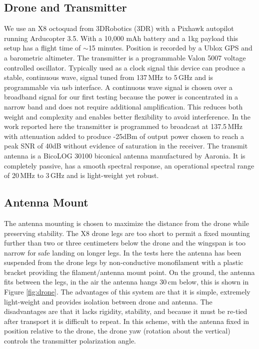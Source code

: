 \documentclass[preprint2,numberedappendix,tighten,twocolappendix]{aastex6}
\begin{document}
\subsection{Drone and Transmitter}
We use an X8 octoquad from 3DRobotics (3DR) with a Pixhawk autopilot running Arducopter 3.5.  With a 10,000 mAh battery and a 1kg payload this setup has a flight time of $\sim$15 minutes. Position is recorded by a Ublox GPS and a barometric altimeter.  The transmitter is a programmable Valon 5007 voltage controlled oscillator. Typically used as a clock signal this device can produce a stable, continuous wave, signal tuned from 137\,MHz to 5\,GHz and is programmable via usb interface.  A continuous wave signal is chosen over a broadband signal for our first testing because the power is concentrated in a narrow band and does not require additional amplification. This reduces both weight and complexity and enables better flexibility to avoid interference.  In the work reported here the transmitter is programmed to broadcast at 137.5\,MHz with attenuation added to produce -25dBm of output power chosen to reach a peak SNR of 40dB without evidence of saturation in the receiver.  The transmit antenna is a BicoLOG 30100 biconical antenna manufactured by Aaronia. It is completely passive, has a smooth spectral response, an operational spectral range of 20\,MHz to 3\,GHz and is light-weight yet robust. 



\subsection{Antenna Mount}
The antenna mounting is chosen to maximize the distance from the drone while preserving stability. The X8 drone legs are too short to permit a fixed mounting further than two or three centimeters below the drone and the wingspan is too narrow for safe landing on longer legs. In the tests here the antenna has been suspended from the drone legs by non-conductive monofilament with a plastic bracket providing the filament/antenna mount point. On the ground, the antenna fits between the legs, in the air the antenna hangs 30\,cm below, this is shown in Figure \ref{fig:drone}. The advantages of this system are that it is simple, extremely light-weight and provides isolation between drone and antenna. The disadvantages are that it lacks rigidity, stability, and because it must be re-tied after transport it is difficult to repeat.  In this scheme, with the antenna fixed in position relative to the drone, the drone yaw (rotation about the vertical) controls the transmitter polarization angle. 
\end{document}
